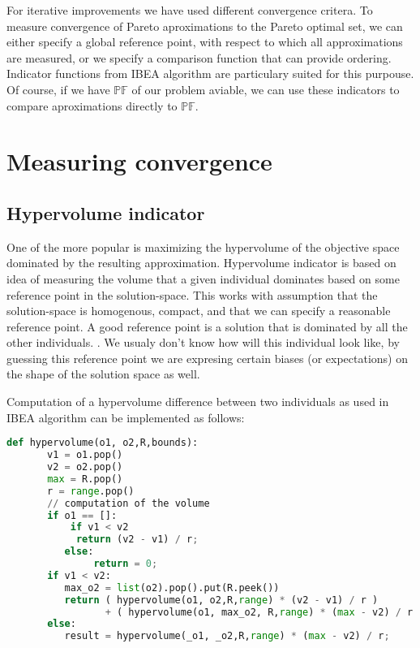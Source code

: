 \documentclass[12pt,oneside]{fithesis2}
\begin{document}
For iterative improvements we have used different convergence critera. To measure convergence of Pareto aproximations to the Pareto optimal set, we can either specify a global reference point, with respect to which all approximations are measured, or we specify a comparison function that can provide ordering. Indicator functions from IBEA algorithm are particulary suited for this purpouse. Of course, if we have $\mathbb{PF}$ of our problem aviable, we can use these indicators to compare aproximations directly to $\mathbb{PF}$.

\section{Measuring convergence}

\subsection{Hypervolume indicator}
One of the more popular is maximizing the hypervolume of the objective space dominated by the resulting approximation. Hypervolume indicator is based on idea of measuring the volume that a given individual dominates based on some reference point in the solution-space. This works with assumption that the solution-space is homogenous, compact, and that we can specify a reasonable reference point. A good reference point is a solution that is dominated by all the other individuals. \cite{auger2009theory}. We usualy don't know how will this individual look like, by guessing this reference point we are expresing certain biases (or expectations) on the shape of the solution space as well.

Computation of a hypervolume difference between two individuals as used in IBEA algorithm can be implemented as follows:
\begin{lstlisting}[language=Python,label=hv_example,caption=Hypervolume implementation]
def hypervolume(o1, o2,R,bounds):
       v1 = o1.pop()
       v2 = o2.pop()
       max = R.pop()
       r = range.pop()
       // computation of the volume
       if o1 == []:
           if v1 < v2
            return (v2 - v1) / r;
          else:
               return = 0;
       if v1 < v2:
          max_o2 = list(o2).pop().put(R.peek())
          return ( hypervolume(o1, o2,R,range) * (v2 - v1) / r ) 
                 + ( hypervolume(o1, max_o2, R,range) * (max - v2) / r );
       else:
          result = hypervolume(_o1, _o2,R,range) * (max - v2) / r;
\end{lstlisting}
\end{document}
